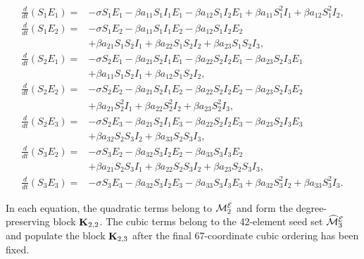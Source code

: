\begin{align*}
\frac{d}{dt}(S_1E_1)
={}&-\sigma S_1E_1
-\beta a_{11}S_1I_1E_1
-\beta a_{12}S_1I_2E_1
+\beta a_{11}S_1^2I_1
+\beta a_{12}S_1^2I_2,\\
\frac{d}{dt}(S_1E_2)
={}&-\sigma S_1E_2
-\beta a_{11}S_1I_1E_2
-\beta a_{12}S_1I_2E_2\\
&+\beta a_{21}S_1S_2I_1
+\beta a_{22}S_1S_2I_2
+\beta a_{23}S_1S_2I_3,\\
\frac{d}{dt}(S_2E_1)
={}&-\sigma S_2E_1
-\beta a_{21}S_2I_1E_1
-\beta a_{22}S_2I_2E_1
-\beta a_{23}S_2I_3E_1\\
&+\beta a_{11}S_1S_2I_1
+\beta a_{12}S_1S_2I_2,\\
\frac{d}{dt}(S_2E_2)
={}&-\sigma S_2E_2
-\beta a_{21}S_2I_1E_2
-\beta a_{22}S_2I_2E_2
-\beta a_{23}S_2I_3E_2\\
&+\beta a_{21}S_2^2I_1
+\beta a_{22}S_2^2I_2
+\beta a_{23}S_2^2I_3,\\
\frac{d}{dt}(S_2E_3)
={}&-\sigma S_2E_3
-\beta a_{21}S_2I_1E_3
-\beta a_{22}S_2I_2E_3
-\beta a_{23}S_2I_3E_3\\
&+\beta a_{32}S_2S_3I_2
+\beta a_{33}S_2S_3I_3,\\
\frac{d}{dt}(S_3E_2)
={}&-\sigma S_3E_2
-\beta a_{32}S_3I_2E_2
-\beta a_{33}S_3I_3E_2\\
&+\beta a_{21}S_2S_3I_1
+\beta a_{22}S_2S_3I_2
+\beta a_{23}S_2S_3I_3,\\
\frac{d}{dt}(S_3E_3)
={}&-\sigma S_3E_3
-\beta a_{32}S_3I_2E_3
-\beta a_{33}S_3I_3E_3
+\beta a_{32}S_3^2I_2
+\beta a_{33}S_3^2I_3.
\end{align*}

In each equation, the quadratic terms belong to $\mathcal M_2^{\mathcal{E}}$ and
form the degree-preserving block $\mathbf{K}_{2,2}$. The cubic terms belong to the
42-element seed set $\widehat{\mathcal M}_3^{\mathcal{E}}$ and populate the block
$\mathbf{K}_{2,3}$ after the final 67-coordinate cubic ordering has been fixed.
